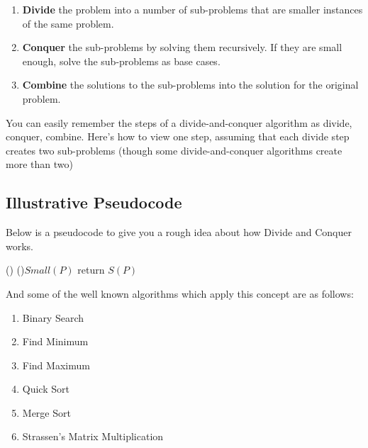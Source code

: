 \documentclass[a4paper,12pt]{article}
\theoremstyle{definition}
\begin{document}
    \begin{enumerate}
        \item \textbf{Divide} the problem into a number of sub-problems that are smaller instances of the same problem.
        \item \textbf{Conquer} the sub-problems by solving them recursively. If they are small enough,
        solve the sub-problems as base cases.
        \item \textbf{Combine} the solutions to the sub-problems into the solution for the original problem.
    \end{enumerate}

    You can easily remember the steps of a divide-and-conquer algorithm as divide, conquer, combine.
    Here's how to view one step, assuming that each divide step creates two sub-problems
    (though some divide-and-conquer algorithms create more than two)

    \subsection{Illustrative Pseudocode}

    Below is a pseudocode to give you a rough idea about how Divide and Conquer works.

    \begin{algorithm}[H]
        \Fn(){}{
            \If(){$Small(P)$}{
                return $S(P)$
            }
        }
    \end{algorithm}

    \noindent
    And some of the well known algorithms which apply this concept are as follows:

    \begin{enumerate}
        \item Binary Search
        \item Find Minimum
        \item Find Maximum
        \item Quick Sort
        \item Merge Sort
        \item Strassen's Matrix Multiplication
    \end{enumerate}
\end{document}
